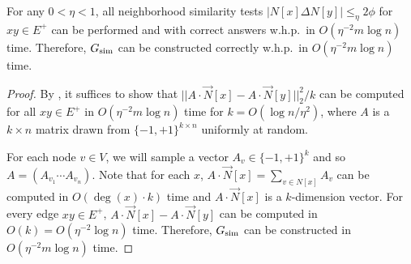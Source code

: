 \begin{lemma}\label{lem:efficient_test} For any $0 < \eta < 1$, all neighborhood similarity tests $|N[x] \Delta N[y]| \leq_{\eta} 2\phi$ for $xy \in E^{+}$ can be performed and with correct answers w.h.p.~in $O(\eta^{-2} m \log n)$ time. Therefore, $G_{\operatorname{sim}}$ can be constructed correctly w.h.p.~in $O(\eta^{-2} m \log n)$ time.\end{lemma}

\begin{proof}
By , it suffices to show that $||A \cdot \vec{N}[x] - A \cdot \vec{N}[y]||^2_{2}/k$ can be computed for all $xy \in E^{+}$ in $O(\eta^{-2} m \log n)$ time for $k = O(\log n /\eta^2)$, where $A$ is a $k \times n$ matrix drawn from $\{-1, +1\}^{k \times n}$ uniformly at random. 

For each node $v \in V$, we will sample a vector $A_v \in \{-1, +1\}^k$ and so $A = (A_{v_1} \cdots A_{v_n})$. Note that for each $x$, $A \cdot \vec{N}[x] = \sum_{v \in N[x]} A_v$ can be computed in $O(\deg(x)\cdot k)$ time and $A \cdot \vec{N}[x]$ is a $k$-dimension vector. For every edge $xy \in E^{+}$, $A\cdot \vec{N}[x] - A\cdot \vec{N}[y]$ can be computed in $O(k) = O(\eta^{-2} \log n)$ time. Therefore, $G_{\operatorname{sim}}$ can be constructed in $O(\eta^{-2 }m \log n)$ time.
\end{proof}


